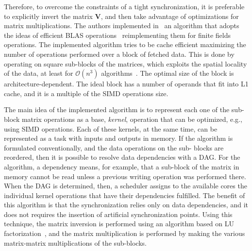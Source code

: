 Therefore, to overcome the constraints of a tight synchronization, it is
preferable to explicitly invert the matrix $\textbf{V}$, and then take advantage
of optimizations for matrix multiplications. The authors implemented
in~\cite{wunderlich2015network} an algorithm that adopts the ideas of efficient
\ac{BLAS} operations~\cite{lawson1979basic} reimplementing them for finite
fields operations. The implemented algorithm tries to be cache efficient
maximizing the number of operations performed over a block of fetched data. This
is done by operating on square sub-blocks of the matrices, which exploits the
spatial locality of the data, at least for $\mathcal{O}(n^3)$
algorithms~\cite{golub2012matrix}. The optimal size of the block is
architecture-dependent. The ideal block has a number of operands that fit into
L1 cache, and it is a multiple of the \ac{SIMD} operations size.

The main idea of the implemented algorithm is to represent each one of the sub-
block matrix operations as a base, \textit{kernel}, operation that can be
optimized, e.g., using \ac{SIMD} operations. Each of these kernels, at the same
time, can be represented as a task with inputs and outputs in memory. If the
algorithm is formulated conventionally, and the data operations on the sub-
blocks are reordered, then it is possible to resolve data dependencies with a
\ac{DAG}. For the algorithm, a dependency means, for example, that a sub-block
of the matrix in memory cannot be read unless a previous writing operation was
performed there. When the \ac{DAG} is determined, then, a scheduler assigns to
the available cores the individual kernel operations that have their
dependencies fulfilled. The benefit of this algorithm is that the
synchronization relies only on data dependencies, and it does not requires the
insertion of artificial synchronization points. Using this technique, the matrix
inversion is performed using an algorithm based on LU
factorization~\cite{Dongarra:2011:HPM:2132876.2132885}, and the matrix
multiplication is performed by making the various matrix-matrix multiplications
of the sub-blocks.
